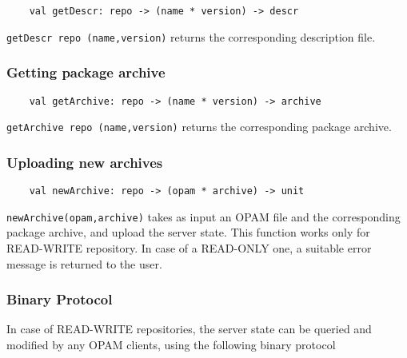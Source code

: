 \documentclass[a4paper,11pt]{article}
\begin{document}
\begin{verbatim}
    val getDescr: repo -> (name * version) -> descr
\end{verbatim}

{\tt getDescr repo (name,version)} returns the corresponding
description file.

\subsubsection{Getting package archive}
\label{getArchive}

\begin{verbatim}
    val getArchive: repo -> (name * version) -> archive
\end{verbatim}

{\tt getArchive repo (name,version)} returns the corresponding package
archive.

\subsubsection{Uploading new archives}
\label{newArchive}

\begin{verbatim}
    val newArchive: repo -> (opam * archive) -> unit
\end{verbatim}

{\tt newArchive(opam,archive)} takes as input an OPAM file and the
corresponding package archive, and upload the server state. This
function works only for READ-WRITE repository. In case of a READ-ONLY
one, a suitable error message is returned to the user.

\subsubsection{Binary Protocol}

In case of READ-WRITE repositories, the server state can be queried
and modified by any OPAM clients, using the following binary protocol
\end{document}
